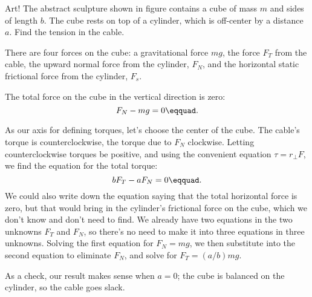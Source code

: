 \begin{eg}{Art!}\label{eg:modern-art}
\egquestion The abstract sculpture shown in figure 
contains a cube of mass $m$ and sides of length $b$.
The cube rests on top of a cylinder, which is off-center by a distance $a$.
Find the tension in the cable.

\eganswer There are four forces on the cube:
a gravitational force $mg$, 
the force $F_T$ from the cable, the upward normal
force from the cylinder, $F_N$, and the horizontal static frictional force
from the cylinder, $F_s$.

The total force on the cube in the vertical direction is zero:
\begin{equation*}
  F_N-mg = 0\eqquad.
\end{equation*}

As our axis for defining torques, let's choose the center of the cube.
The  cable's torque is counterclockwise,
the torque due to $F_N$ clockwise.
Letting counterclockwise torques be
positive, and using the convenient equation $\tau=r_\perp F$, we find
the equation for the total torque:
\begin{equation*}
  b F_T - aF_N = 0\eqquad.
\end{equation*}
We could also write down the equation saying that the total horizontal
force is zero, but that would bring in the cylinder's frictional force
on the cube, which we don't know and don't need to find. We already have
two equations in the two unknowns $F_T$ and $F_N$, so there's no need
to make it into three equations in three unknowns.
Solving the first
equation for $F_N=mg$, we then substitute into the second equation
to eliminate $F_N$, and solve for $F_T=(a/b)mg$.

As a check, our result makes sense when $a=0$; the cube is balanced on the
cylinder, so the cable goes slack.
\end{eg}
